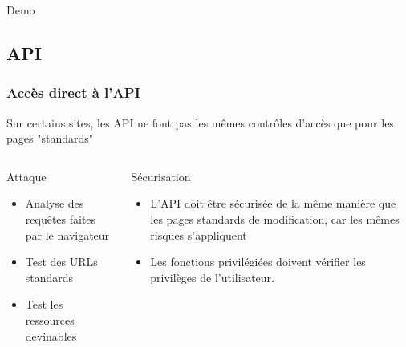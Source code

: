 \documentclass[aspectratio=169]{beamer}  %
\newcommand{\demo}{
\begin{frame}[noframenumbering]
  \begin{center}
    \Huge Demo
  \end{center}
\end{frame}}
\begin{document}
\demo
  
\subsection{API}
\begin{frame}
  \frametitle{Accès direct à l'API}
  Sur certains sites, les API ne font pas les mêmes contrôles d'accès que pour les pages "standards"
  \begin{columns}[T]
      \begin{alertblock}{Attaque}
        \begin{itemize}
          \item Analyse des requêtes faites par le navigateur
          \item Test des URLs standards
          \item Test les ressources devinables
        \end{itemize}
      \end{alertblock}
      \begin{exampleblock}{Sécurisation}
        \begin{itemize}
          \item L'API doit être sécurisée de la même manière que les pages standards de modification, car les mêmes risques s'appliquent
          \item Les fonctions privilégiées doivent vérifier les privilèges de l’utilisateur.
        \end{itemize}
      \end{exampleblock}
  \end{columns}
\end{frame}
\end{document}
